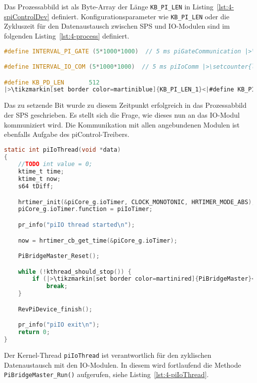 Das Prozessabbild ist als Byte-Array der Länge \lstinline{KB_PI_LEN} in Listing~\ref{lst:4-spiControlDev} definiert. Konfigurationsparameter wie \lstinline{KB_PI_LEN} oder die Zykluszeit für den Datenaustausch zwischen SPS und IO-Modulen sind im folgenden Listing~\ref{lst:4-process} definiert.

\begin{lstlisting}[language={c},firstnumber=119,caption={Konfigurationsparameter des Prozessabbildes in project.h\label{lst:4-process}}]
#define INTERVAL_PI_GATE (5*1000*1000)  // 5 ms piGateCommunication |>\setcounter{lstnumber}{128}<|

#define INTERVAL_IO_COM (5*1000*1000)  // 5 ms piIoComm |>\setcounter{lstnumber}{132}<|

#define KB_PD_LEN       512
|>\tikzmarkin[set border color=martiniblue]{KB_PI_LEN_1}<|#define KB_PI_LEN       4096|>\tikzmarkend{KB_PI_LEN_1}<|
\end{lstlisting}

Das zu setzende Bit wurde zu diesem Zeitpunkt erfolgreich in das Prozessabbild der SPS geschrieben.
Es stellt sich die Frage, wie dieses nun an das IO-Modul kommuniziert wird.
Die Kommunikation mit allen angebundenen Modulen ist ebenfalls Aufgabe des piControl-Treibers.

\begin{lstlisting}[language={c},firstnumber=256,caption={Auszug der Methode \lstinline{piIoThread} in \lstinline{revpi_core.c}\label{lst:4-piIoThread}}]
static int piIoThread(void *data)
{
	//TODO int value = 0;
	ktime_t time;
	ktime_t now;
	s64 tDiff;

	hrtimer_init(&piCore_g.ioTimer, CLOCK_MONOTONIC, HRTIMER_MODE_ABS);
	piCore_g.ioTimer.function = piIoTimer;

	pr_info("piIO thread started\n");

	now = hrtimer_cb_get_time(&piCore_g.ioTimer);

	PiBridgeMaster_Reset();

	while (!kthread_should_stop()) {
		if (|>\tikzmarkin[set border color=martinired]{PiBridgeMaster}<|PiBridgeMaster_Run()|>\tikzmarkend{PiBridgeMaster}<| < 0)
			break;
	}

	RevPiDevice_finish();

	pr_info("piIO exit\n");
	return 0;
}
\end{lstlisting}

Der Kernel-Thread \lstinline{piIoThread} ist verantwortlich für den zyklischen Datenaustausch mit den IO-Modulen. In diesem wird fortlaufend die Methode \lstinline{PiBridgeMaster_Run()} aufgerufen, siehe Listing~\ref{lst:4-piIoThread}.

